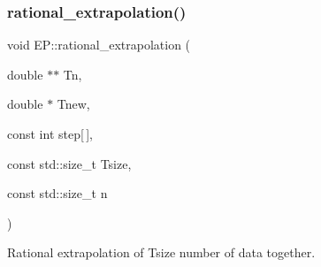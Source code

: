 \subsubsection{\texorpdfstring{rational\+\_\+extrapolation()}{rational\_extrapolation()}}
{\footnotesize\ttfamily void E\+P\+::rational\+\_\+extrapolation (\begin{DoxyParamCaption}\item[{double $\ast$$\ast$}]{Tn,  }\item[{double $\ast$}]{Tnew,  }\item[{const int}]{step\mbox{[}$\,$\mbox{]},  }\item[{const std\+::size\+\_\+t}]{Tsize,  }\item[{const std\+::size\+\_\+t}]{n }\end{DoxyParamCaption})}



Rational extrapolation of Tsize number of data together. 

